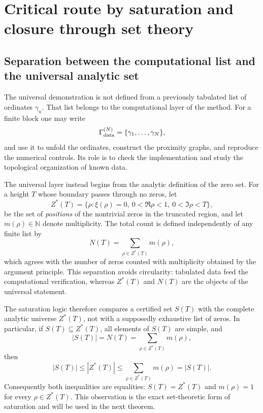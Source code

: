 \documentclass[11pt]{amsart}
\theoremstyle{definition}
\theoremstyle{remark}
\begin{document}
\section{Critical route by saturation and closure through set theory}\label{sec:saturation}
\subsection{Separation between the computational list and the universal analytic set}\label{subsec:list-vs-set}
The universal demonstration is not defined from a previously tabulated list of ordinates $\gamma_n$. That list belongs to the computational layer of the method. For a finite block one may write
\begin{equation}\label{eq:computational-list}
 \Gamma_{\rm data}^{(N)}=\{\gamma_1,\ldots,\gamma_N\},
\end{equation}
and use it to unfold the ordinates, construct the proximity graphs, and reproduce the numerical controls. Its role is to check the implementation and study the topological organization of known data.

The universal layer instead begins from the analytic definition of the zero set. For a height $T$ whose boundary passes through no zeros, let
\begin{equation}\label{eq:analytic-support}
 Z^*(T)=\{\rho:\xi(\rho)=0,\ 0<\Re\rho<1,\ 0<\Im\rho<T\},
\end{equation}
be the set of \emph{positions} of the nontrivial zeros in the truncated region, and let $m(\rho)\in\mathbb N$ denote multiplicity. The total count is defined independently of any finite list by
\begin{equation}\label{eq:NTmultiplicity}
 N(T)=\sum_{\rho\in Z^*(T)}m(\rho),
\end{equation}
which agrees with the number of zeros counted with multiplicity obtained by the argument principle. This separation avoids circularity: tabulated data feed the computational verification, whereas $Z^*(T)$ and $N(T)$ are the objects of the universal statement.

The saturation logic therefore compares a certified set $S(T)$ with the complete analytic universe $Z^*(T)$, not with a supposedly exhaustive list of zeros. In particular, if $S(T)\subseteq Z^*(T)$, all elements of $S(T)$ are simple, and
\begin{equation}\label{eq:saturation-simple-chain}
 |S(T)|=N(T)=\sum_{\rho\in Z^*(T)}m(\rho),
\end{equation}
then
\[
 |S(T)|\le |Z^*(T)|\le \sum_{\rho\in Z^*(T)}m(\rho)=|S(T)|.
\]
Consequently both inequalities are equalities: $S(T)=Z^*(T)$ and $m(\rho)=1$ for every $\rho\in Z^*(T)$. This observation is the exact set-theoretic form of saturation and will be used in the next theorem.
\end{document}
